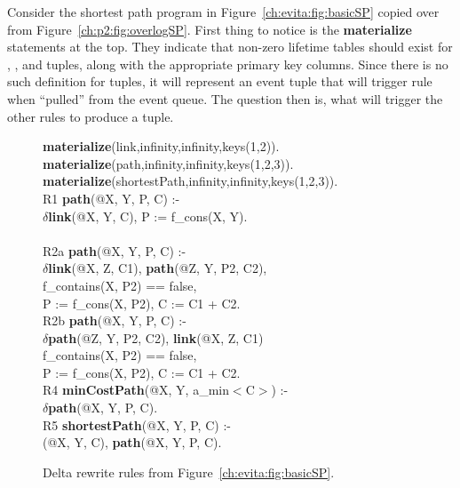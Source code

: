 Consider the shortest path program in Figure~\ref{ch:evita:fig:basicSP} copied
over from Figure~\ref{ch:p2:fig:overlogSP}.  First thing to notice is the {\bf
materialize} statements at the top.  They indicate that non-zero lifetime
tables should exist for , , and  tuples,
along with the appropriate primary key columns.  Since there is no such
definition for  tuples, it will represent an event tuple that
will trigger rule~ when ``pulled'' from the event queue. The question
then is, what will trigger the other rules to produce a  tuple.

\begin{figure}[!t]
\ssp
\centering
\begin{boxedminipage}{\linewidth}
{\bf materialize}(link,infinity,infinity,keys(1,2)). \\
{\bf materialize}(path,infinity,infinity,keys(1,2,3)).  \\
{\bf materialize}(shortestPath,infinity,infinity,keys(1,2,3)). \\
  
R1 {\bf path}(@X, Y, P, C) :- \\
\datalogspace $\delta${\bf link}(@X, Y, C), P := f\_cons(X, Y). \\
\\
R2a {\bf path}(@X, Y, P, C) :- \\
\datalogspace $\delta${\bf link}(@X, Z, C1), {\bf path}(@Z, Y, P2, C2),\\
\datalogspace f\_contains(X, P2) == false, \\
\datalogspace P := f\_cons(X, P2), C := C1 + C2. \\

R2b {\bf path}(@X, Y, P, C) :- \\
\datalogspace $\delta${\bf path}(@Z, Y, P2, C2), {\bf link}(@X, Z, C1) \\
\datalogspace f\_contains(X, P2) == false, \\
\datalogspace P := f\_cons(X, P2), C := C1 + C2. \\


R4 {\bf minCostPath}(@X, Y, a\_min$<$C$>$) :-  \\
\datalogspace $\delta${\bf path}(@X, Y, P, C). \\ 

R5 {\bf shortestPath}(@X, Y, P, C) :- \\
(@X, Y, C), {\bf path}(@X, Y, P, C).

\end{boxedminipage}
\caption{\label{ch:evita:fig:basicSPDelta}Delta rewrite rules from Figure~\ref{ch:evita:fig:basicSP}.}
\end{figure}


